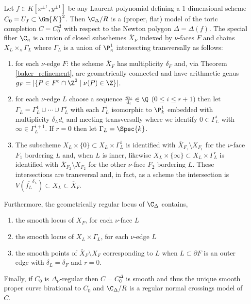 \begin{theorem}
Let $f \in K[x^{\pm 1}, y^{\pm 1}]$ be any Laurent polynomial defining a 1-dimensional scheme $C_0 = U_f \subset \Gm{K}^2$. Then $\C_\Delta / R$ is a (proper, flat) model of the toric completion $C = C_0^\Delta$ with respect to the Newton polygon $\Delta = \Delta(f)$. The special fiber $\C_\kappa$ is a union of closed subschemes $\overline{X}_F$ indexed by $\nu$-faces $F$ and chains $X_L \times_\kappa \Gamma_L$ where $\Gamma_L$ is a union of $\P^1_{\kappa}$ intersecting transversally as follows:
\begin{enumerate}
\item for each $\nu$-edge $F$: the scheme $\overline{X}_F$ has multiplicity $\delta_F$ and, via Theorem \ref{baker_refinement}, are geometrically connected and have arithmetic genus $ g_F = |\{ P \in F^\circ \cap \Z^2 \mid \nu(P) \in \Z \} | $.
\item for each $\nu$-edge $L$ choose a sequence $\frac{m_i}{d_i} \in \Q$ ($0 \le i \le r+1$) then let $\Gamma_L = \Gamma^1_L \cup \cdots \cup \Gamma^r_L$ with each $\Gamma^i_L$ isomorphic to $\P^1_k$ embedded with multiplicity $\delta_L d_i$ and meeting transversally where we identify $0 \in \Gamma^i_L$ with $\infty \in \Gamma^{i+1}_L$. If $r = 0$ then let $\Gamma_L = \Spec{k}$.
\item The subscheme $X_L \times \{ 0 \} \subset X_L \times \Gamma^1_L$ is identified with $\overline{X}_{F_1} \setminus X_{F_1}$ for the $\nu$-face $F_1$ bordering $L$ and, when $L$ is inner, likewise $X_L \times \{ \infty \} \subset X_L \times \Gamma^r_L$ is identified with $\overline{X}_{F_2} \setminus X_{F_2}$ for the other $\nu$-face $F_2$ bordering $L$. These intersections are transversal and, in fact, as a scheme the intersection is $V(\overline{f_L}^{\delta_L}) \subset X_L \subset \overline{X}_F$. 
\end{enumerate}
Furthermore, the geometrically regular locus of $\C_\Delta$ contains,
\begin{enumerate}
\item the smooth locus of $X_F$, for each $\nu$-face $L$
\item the smooth locus of $X_L \times \Gamma_L$, for each $\nu$-edge $L$
\item the smooth points of $\overline{X}_F \setminus X_F$ corresponding to $L$ when $L \subset \partial F$ is an outer edge with $\delta_L = \delta_F$ and $r = 0$. 
\end{enumerate}
Finally, if $C_0$ is $\Delta_\nu$-regular then $C = C_0^\Delta$ is smooth and thus the unique smooth proper curve birational to $C_0$ and $\C_\Delta / R$ is a regular normal crossings model of $C$. 
\end{theorem}

